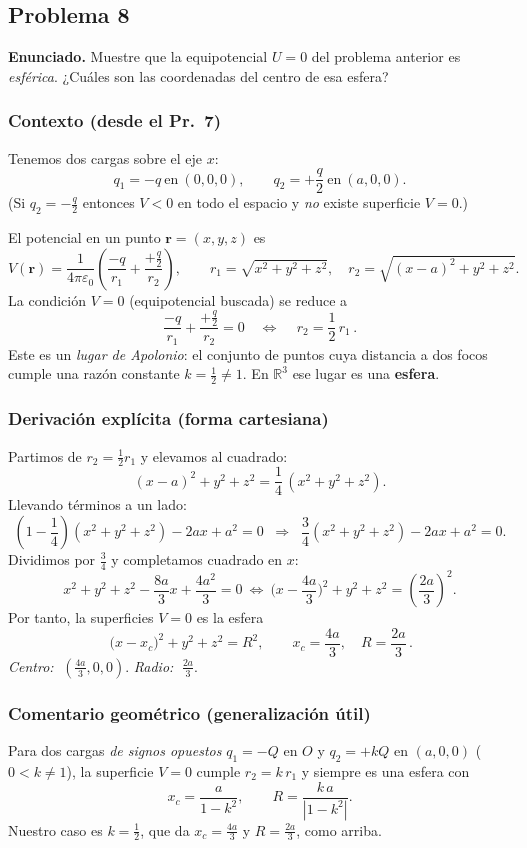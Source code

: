 \documentclass{article}
\begin{document}
\subsection{Problema 8} \vspace{0.5cm}

\textbf{Enunciado.} Muestre que la equipotencial $U=0$ del problema anterior es \emph{esférica}. ¿Cuáles son las coordenadas del centro de esa esfera?

\subsubsection*{Contexto (desde el Pr.~7)}
Tenemos dos cargas sobre el eje $x$:
\[
q_1=-q \ \text{en}\ (0,0,0), \qquad q_2=+\frac{q}{2}\ \text{en}\ (a,0,0).
\]
(Si $q_2=-\tfrac{q}{2}$ entonces $V<0$ en todo el espacio y \emph{no} existe superficie $V=0$.)

El potencial en un punto $\mathbf r=(x,y,z)$ es
\[
V(\mathbf r)=\frac{1}{4\pi\varepsilon_0}\left(\frac{-q}{r_1}+\frac{+\frac{q}{2}}{r_2}\right),
\qquad
r_1=\sqrt{x^2+y^2+z^2},\quad
r_2=\sqrt{(x-a)^2+y^2+z^2}.
\]
La condición $V=0$ (equipotencial buscada) se reduce a
\[
\frac{-q}{r_1}+\frac{+\frac{q}{2}}{r_2}=0
\quad\Longleftrightarrow\quad
\boxed{\,r_2=\frac{1}{2}\,r_1\,}.
\]
Este es un \emph{lugar de Apolonio}: el conjunto de puntos cuya distancia a dos focos cumple una razón constante $k=\tfrac{1}{2}\neq 1$. En $\mathbb{R}^3$ ese lugar es una \textbf{esfera}.

\subsubsection*{Derivación explícita (forma cartesiana)}
Partimos de $r_2=\tfrac{1}{2}r_1$ y elevamos al cuadrado:
\[
(x-a)^2+y^2+z^2=\frac{1}{4}\,(x^2+y^2+z^2).
\]
Llevando términos a un lado:
\[
\left(1-\frac{1}{4}\right)(x^2+y^2+z^2)-2ax+a^2=0
\;\;\Longrightarrow\;\;
\frac{3}{4}(x^2+y^2+z^2)-2ax+a^2=0.
\]
Dividimos por $\tfrac{3}{4}$ y completamos cuadrado en $x$:
\[
x^2+y^2+z^2-\frac{8a}{3}x+\frac{4a^2}{3}=0
\ \Longleftrightarrow\
\big(x-\frac{4a}{3}\big)^2+y^2+z^2=\left(\frac{2a}{3}\right)^2.
\]
Por tanto, la superficies $V=0$ es la esfera
\[
\boxed{\,\big(x-x_c\big)^2+y^2+z^2=R^2,\qquad
x_c=\frac{4a}{3},\quad R=\frac{2a}{3}\,}.
\]
\emph{Centro:} $\;(\tfrac{4a}{3},0,0)$. \quad \emph{Radio:} $\;\tfrac{2a}{3}$.

\subsubsection*{Comentario geométrico (generalización útil)}
Para dos cargas \emph{de signos opuestos} $q_1=-Q$ en $O$ y $q_2=+kQ$ en $(a,0,0)$ ($0<k\neq 1$), la superficie $V=0$ cumple $r_2=k\,r_1$ y siempre es una esfera con
\[
x_c=\frac{a}{1-k^2},\qquad
R=\frac{k\,a}{|1-k^2|}.
\]
Nuestro caso es $k=\tfrac{1}{2}$, que da $x_c=\tfrac{4a}{3}$ y $R=\tfrac{2a}{3}$, como arriba.
\end{document}
